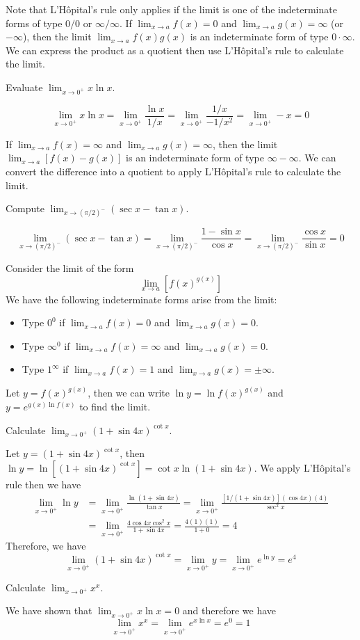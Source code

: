Note that L'Hôpital's rule only applies if the limit is one of the
indeterminate forms of type \(0/0\) or \(\infty/\infty\).
If \(\lim_{x\to a}f(x)=0\) and \(\lim_{x\to a}g(x)=\infty\) (or \(-\infty\)),
then the limit \(\lim_{x\to a}f(x)g(x)\) is an indeterminate form of type
\(0\cdot\infty\).
We can express the product as a quotient then use L'Hôpital's rule to
calculate the limit.
\begin{problem}
    Evaluate \(\lim_{x\to 0^+}x\ln x\).
\end{problem}
\begin{solution}
    \[\lim_{x\to 0^+}x\ln x=\lim_{x\to 0^+}\frac{\ln x}{1/x}
    =\lim_{x\to 0^+}\frac{1/x}{-1/x^2}=\lim_{x\to 0^+}-x=0\]
\end{solution}
If \(\lim_{x\to a}f(x)=\infty\) and \(\lim_{x\to a}g(x)=\infty\), then the
limit \(\lim_{x\to a}[f(x)-g(x)]\) is an indeterminate form of type
\(\infty-\infty\).
We can convert the difference into a quotient to apply L'Hôpital's rule to
calculate the limit.
\begin{problem}
    Compute \(\lim_{x\to (\pi/2)^-}(\sec x-\tan x)\).
\end{problem}
\begin{solution}
    \[\lim_{x\to (\pi/2)^-}(\sec x-\tan x)
    =\lim_{x\to (\pi/2)^-}\frac{1-\sin x}{\cos x}
    =\lim_{x\to (\pi/2)^-}\frac{\cos x}{\sin x}=0\]
\end{solution}
Consider the limit of the form \[\lim_{x\to a}[f(x)^{g(x)}]\]
We have the following indeterminate forms arise from the limit:
\begin{itemize}
    \item Type \(0^0\) if \(\lim_{x\to a}f(x)=0\) and \(\lim_{x\to a}g(x)=0\).
    \item Type \(\infty^0\) if \(\lim_{x\to a}f(x)=\infty\) and
    \(\lim_{x\to a}g(x)=0\).
    \item Type \(1^\infty\) if \(\lim_{x\to a}f(x)=1\) and
    \(\lim_{x\to a}g(x)=\pm\infty\).
\end{itemize}
Let \(y=f(x)^{g(x)}\), then we can write \(\ln y=\ln f(x)^{g(x)}\) and
\(y=e^{g(x)\ln f(x)}\) to find the limit.
\begin{problem}
    Calculate \(\lim_{x\to 0^+}(1+\sin 4x)^{\cot x}\).
\end{problem}
\begin{solution}
    Let \(y=(1+\sin 4x)^{\cot x}\), then \(\ln y=\ln[(1+\sin 4x)^{\cot x}]=\cot x\ln(1+\sin 4x)\).
    We apply L'Hôpital's rule then we have
    \begin{align*}
    \lim_{x\to 0^+}\ln y &= \lim_{x\to 0^+}\frac{\ln(1+\sin 4x)}{\tan x}
    =\lim_{x\to 0^+}\frac{[1/(1+\sin 4x)](\cos 4x)(4)}{\sec^2 x} \\
    &= \lim_{x\to 0^+}\frac{4\cos 4x\cos^2 x}{1+\sin 4x}=\frac{4(1)(1)}{1+0}=4
    \end{align*}
    Therefore, we have
    \[\lim_{x\to 0^+}(1+\sin 4x)^{\cot x}=\lim_{x\to 0^+}y
    =\lim_{x\to 0^+}e^{\ln y}=e^4\]
\end{solution}
\begin{problem}
    Calculate \(\lim_{x\to 0^+}x^x\).
\end{problem}
\begin{solution}
    We have shown that \(\lim_{x\to 0^+}x\ln x=0\) and therefore we have
    \[\lim_{x\to 0^+}x^x=\lim_{x\to 0^+}e^{x\ln x}=e^0=1\]
\end{solution}